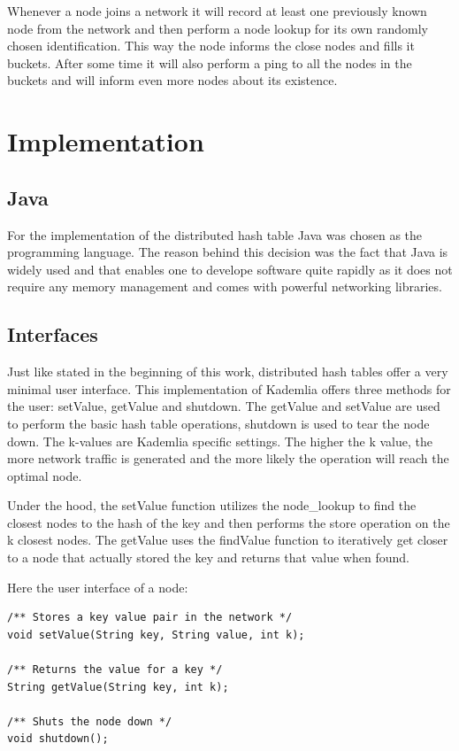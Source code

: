\documentclass[a4paper, 12pt]{article} %
\begin{document}
Whenever a node joins a network it will record at least one previously known node from the network and then perform a node lookup for its own randomly chosen identification. This way the node informs the close nodes and fills it buckets. After some time it will also perform a ping to all the nodes in the buckets and will inform even more nodes about its existence.\cite{Maymounkov2002}

\newpage
\section{Implementation}

\subsection{Java}

For the implementation of the distributed hash table Java was chosen as the programming language. The reason behind this decision was the fact that Java is widely used and that enables one to develope software quite rapidly as it does not require any memory management and comes with powerful networking libraries.

\subsection{Interfaces}

Just like stated in the beginning of this work, distributed hash tables offer a very minimal user interface. This implementation of Kademlia offers three methods for the user: setValue, getValue and shutdown. The getValue and setValue are used to perform the basic hash table operations, shutdown is used to tear the node down. The k-values are Kademlia specific settings. The higher the k value, the more network traffic is generated and the more likely the operation will reach the optimal node. 

Under the hood, the setValue function utilizes the node\_lookup to find the closest nodes to the hash of the key and then performs the store operation on the k closest nodes. The getValue uses the findValue function to iteratively get closer to a node that actually stored the key and returns that value when found.

Here the user interface of a node:

\begin{verbatim}
/** Stores a key value pair in the network */
void setValue(String key, String value, int k);

/** Returns the value for a key */
String getValue(String key, int k);

/** Shuts the node down */
void shutdown();
\end{verbatim}
\end{document}
